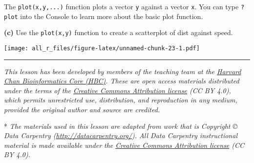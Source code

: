 \documentclass[
]{article}
\begin{document}
The \texttt{plot(x,y,...)} function plots a vector \texttt{y} against a
vector \texttt{x}. You can type \texttt{?plot} into the Console to learn
more about the basic plot function.

\textbf{(c)} Use the \texttt{plot(x,y)} function to create a scatterplot
of dist against speed.

\texttt{[image: all\_r\_files/figure-latex/unnamed-chunk-23-1.pdf]}

\begin{center}\rule{0.5\linewidth}{0.5pt}\end{center}

\emph{This lesson has been developed by members of the teaching team at
the \href{http://bioinformatics.sph.harvard.edu/}{Harvard Chan
Bioinformatics Core (HBC)}. These are open access materials distributed
under the terms of the
\href{https://creativecommons.org/licenses/by/4.0/}{Creative Commons
Attribution license} (CC BY 4.0), which permits unrestricted use,
distribution, and reproduction in any medium, provided the original
author and source are credited.}

* \emph{The materials used in this lesson are adapted from work that is
Copyright © Data Carpentry (\url{http://datacarpentry.org/}). All Data
Carpentry instructional material is made available under the
\href{https://creativecommons.org/licenses/by/4.0/}{Creative Commons
Attribution license} (CC BY 4.0).}
\end{document}
